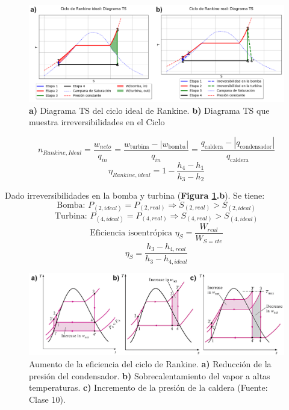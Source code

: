         \begin{figure}
            \includegraphics[width=\textwidth]{img/ciclos/ciclo_rankine.png}
            \caption[Diagrama TS del Ciclo de Rankine]{\textbf{a)} Diagrama TS del ciclo ideal de Rankine. \textbf{b)} Diagrama TS que muestra irreversibilidades en el Ciclo}
            \label{fig:ciclo_rankine}
        \end{figure}
        
        \[n_{Rankine, Ideal}=\frac{w_{neto}}{q_{in}}=\frac{w_{\text{turbina}}-|w_{\text{bomba}}|}{q_{in}}=\frac{q_{\text{caldera}}-|q_{\text{condensador}}|}{q_{\text{caldera}}}\]
        \begin{equation}
        \label{ef_rankine_ideal}
            \eta_{Rankine, ideal} = 1 - \frac{h_{4}-h_{1}}{h_{3}-h_{2}}
        \end{equation}
        
        Dado irreversibilidades en la bomba y turbina (\textbf{Figura \ref{fig:ciclo_rankine}.b}). Se tiene:
        \[\text{Bomba: }P_{(2, ideal)}=P_{(2, real)} \Rightarrow S_{(2, real)}>S_{(2, ideal)}\]
        \[\text{Turbina: }P_{(4, ideal)}=P_{(4, real)} \Rightarrow S_{(4, real)}>S_{(4, ideal)}\]
        \[\text{Eficiencia isoentrópica }\eta_{S}=\frac{W_{real}}{W_{S=cte}}\]
        \begin{equation}
        \label{ef_rankine_isoentropica}
            \eta_{S} = \frac{h_{3} - h_{4, real}}{h_{3} - h_{4, ideal}}
        \end{equation}
        
            
            \begin{figure}
                \includegraphics[width=\textwidth]{img/clases/aumento_eficiencia_rankine.png}
                \caption[Aumento de la eficiencia del ciclo de Rankine (Fuente: Clase 10)]{Aumento de la eficiencia del ciclo de Rankine. \textbf{a)} Reducción de la presión del condensador. \textbf{b)} Sobrecalentamiento del vapor a altas temperaturas. \textbf{c)} Incremento de la presión de la caldera (Fuente: Clase 10).}
                \label{fig:rankine_mas_ef}
            \end{figure}
            
